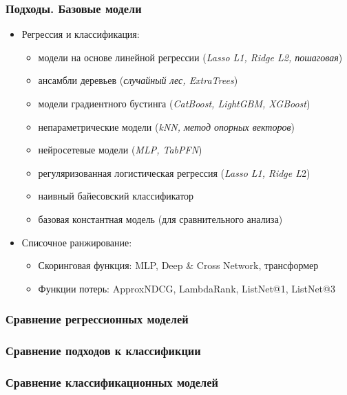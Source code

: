 \documentclass
  [ russian
  , aspectratio=169 %
  ] {beamer}
\begin{document}
\begin{frame}
    \frametitle{Подходы. Базовые модели}
    \begin{itemize}
        \item Регрессия и классификация:
            \begin{itemize}
                \item модели на основе линейной регрессии (\emph{Lasso L1, Ridge L2, пошаговая})
                \item ансамбли деревьев (\emph{случайный лес, ExtraTrees})
                \item модели градиентного бустинга (\emph{CatBoost, LightGBM, XGBoost})
                \item непараметрические модели (\emph{kNN, метод опорных векторов})
                \item нейросетевые модели (\emph{MLP, TabPFN})
                \item регуляризованная логистическая регрессия (\emph{Lasso L1, Ridge L}2)
                \item наивный байесовский классификатор
                \item базовая константная модель (для сравнительного анализа)
            \end{itemize}
        \vspace{0.4em}
        \item Списочное ранжирование:
            \begin{itemize}
                \item Скоринговая функция: MLP, Deep \& Cross Network, трансформер
                \item Функции потерь: ApproxNDCG, LambdaRank, ListNet@1, ListNet@3
            \end{itemize}
    \end{itemize}
\end{frame}


\begin{frame}
    \frametitle{Сравнение регрессионных моделей}
    
\end{frame}


\begin{frame}
    \frametitle{Сравнение подходов к классификции}
    
\end{frame}


\begin{frame}
    \frametitle{Сравнение классификационных моделей}
    
\end{frame}
\end{document}
